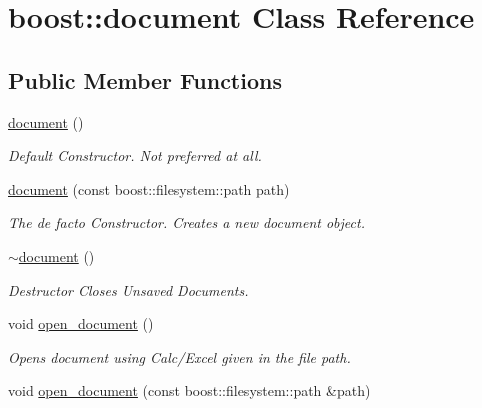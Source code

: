 \hypertarget{classboost_1_1document}{\section{boost\-:\-:document Class Reference}
\label{classboost_1_1document}
}
\subsection*{Public Member Functions}
\begin{DoxyCompactItemize}
\item 
\hypertarget{classboost_1_1document_af1a85718219b8da6f1befaac0bf87989}{\hyperlink{classboost_1_1document_af1a85718219b8da6f1befaac0bf87989}{document} ()}\label{classboost_1_1document_af1a85718219b8da6f1befaac0bf87989}

\begin{DoxyCompactList}\small\item\em Default Constructor. Not preferred at all. \end{DoxyCompactList}\item 
\hypertarget{classboost_1_1document_a2c3bcea48dfd233e0255ae4dd274b6da}{\hyperlink{classboost_1_1document_a2c3bcea48dfd233e0255ae4dd274b6da}{document} (const boost\-::filesystem\-::path path)}\label{classboost_1_1document_a2c3bcea48dfd233e0255ae4dd274b6da}

\begin{DoxyCompactList}\small\item\em The de facto Constructor. Creates a new document object. \end{DoxyCompactList}\item 
\hypertarget{classboost_1_1document_afff6a78ede7767d8cbc0cb4566ae64da}{\hyperlink{classboost_1_1document_afff6a78ede7767d8cbc0cb4566ae64da}{$\sim$document} ()}\label{classboost_1_1document_afff6a78ede7767d8cbc0cb4566ae64da}

\begin{DoxyCompactList}\small\item\em Destructor Closes Unsaved Documents. \end{DoxyCompactList}\item 
\hypertarget{classboost_1_1document_a9e89218509ba65a56d088de9d4696cc5}{void \hyperlink{classboost_1_1document_a9e89218509ba65a56d088de9d4696cc5}{open\-\_\-document} ()}\label{classboost_1_1document_a9e89218509ba65a56d088de9d4696cc5}

\begin{DoxyCompactList}\small\item\em Opens document using Calc/\-Excel given in the file path. \end{DoxyCompactList}\item 
\hypertarget{classboost_1_1document_a3c6af22aa585c734aa8de19dc2b4b335}{void \hyperlink{classboost_1_1document_a3c6af22aa585c734aa8de19dc2b4b335}{open\-\_\-document} (const boost\-::filesystem\-::path \&path)}\label{classboost_1_1document_a3c6af22aa585c734aa8de19dc2b4b335}


\end{DoxyCompactItemize}
